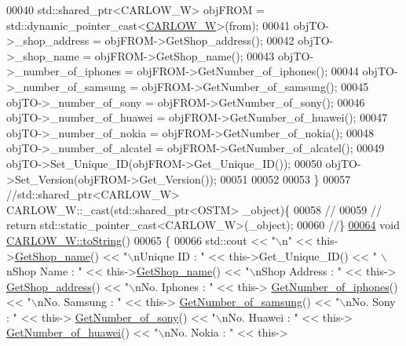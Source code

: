 \begin{DoxyCode}
00040     std::shared\_ptr<CARLOW\_W> objFROM = std::dynamic\_pointer\_cast<\hyperlink{class_c_a_r_l_o_w___w}{CARLOW\_W}>(from);
00041     objTO->\_shop\_address = objFROM->GetShop\_address();
00042     objTO->\_shop\_name = objFROM->GetShop\_name();
00043     objTO->\_number\_of\_iphones = objFROM->GetNumber\_of\_iphones();
00044     objTO->\_number\_of\_samsung = objFROM->GetNumber\_of\_samsung();
00045     objTO->\_number\_of\_sony = objFROM->GetNumber\_of\_sony();
00046     objTO->\_number\_of\_huawei = objFROM->GetNumber\_of\_huawei();
00047     objTO->\_number\_of\_nokia = objFROM->GetNumber\_of\_nokia();
00048     objTO->\_number\_of\_alcatel = objFROM->GetNumber\_of\_alcatel();
00049     objTO->Set\_Unique\_ID(objFROM->Get\_Unique\_ID());
00050     objTO->Set\_Version(objFROM->Get\_Version());
00051     
00052    
00053 \}
00057 \textcolor{comment}{//std::shared\_ptr<CARLOW\_W> CARLOW\_W::\_cast(std::shared\_ptr<OSTM> \_object)\{}
00058 \textcolor{comment}{//    }
00059 \textcolor{comment}{//    return std::static\_pointer\_cast<CARLOW\_W>(\_object);}
00060 \textcolor{comment}{//\}}
\hypertarget{_c_a_r_l_o_w___w_8cpp_source.tex_l00064}{}\hyperlink{class_c_a_r_l_o_w___w_a79e683650f861b59752fb027a5f16e5a}{00064} \textcolor{comment}{}\textcolor{keywordtype}{void} \hyperlink{class_c_a_r_l_o_w___w_a79e683650f861b59752fb027a5f16e5a}{CARLOW\_W::toString}()
00065 \{
00066    std::cout << \textcolor{stringliteral}{"\(\backslash\)n"} <<  this->\hyperlink{class_c_a_r_l_o_w___w_a68235a63964645c525620053a33de863}{GetShop\_name}() << \textcolor{stringliteral}{"\(\backslash\)nUnique ID : "} << this->Get\_Unique\_ID() << \textcolor{stringliteral}{"
      \(\backslash\)nShop Name : "}  << this->\hyperlink{class_c_a_r_l_o_w___w_a68235a63964645c525620053a33de863}{GetShop\_name}() << \textcolor{stringliteral}{"\(\backslash\)nShop Address : "} << this->
      \hyperlink{class_c_a_r_l_o_w___w_af48a2f69706be684115758820ce79ddd}{GetShop\_address}() << \textcolor{stringliteral}{"\(\backslash\)nNo. Iphones : "} << this->
      \hyperlink{class_c_a_r_l_o_w___w_a50395c707116ea1176743ed98c6b1f76}{GetNumber\_of\_iphones}() << \textcolor{stringliteral}{"\(\backslash\)nNo. Samsung : "} << this->
      \hyperlink{class_c_a_r_l_o_w___w_aecc697b6d017d88f2bdbe3cea2bf3496}{GetNumber\_of\_samsung}() << \textcolor{stringliteral}{"\(\backslash\)nNo. Sony : "} << this->
      \hyperlink{class_c_a_r_l_o_w___w_a6d31219dac9b4d8842e14b7414ed286e}{GetNumber\_of\_sony}() << \textcolor{stringliteral}{"\(\backslash\)nNo. Huawei : "} << this->
      \hyperlink{class_c_a_r_l_o_w___w_aea38b51a44cda35a01beb7d45fa7a2a4}{GetNumber\_of\_huawei}() << \textcolor{stringliteral}{"\(\backslash\)nNo. Nokia : "} << this->

\end{DoxyCode}

